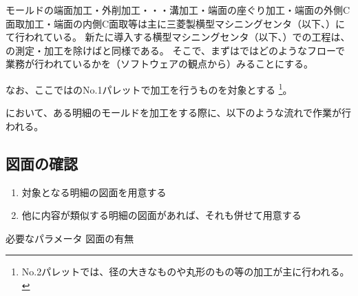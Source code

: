 

モールドの端面加工・外削加工・・・溝加工・端面の座ぐり加工・端面の外側C面取加工・端面の内側C面取等は主に三菱製横型マシニングセンタ（以下、\textbf{\MMname}）にて行われている。
新たに導入する横型マシニングセンタ（以下、\textbf{\DMname}）での工程は、\dimple の測定・加工を除けば\MMname と同様である。
そこで、まずは\MMname ではどのようなフローで業務が行われているかを（ソフトウェアの観点から）みることにする。
\begin{marker}
なお、ここでは\MMname のNo.1パレットで加工を行うものを対象とする
\footnote{No.2パレットでは、径の大きなものや丸形のもの等の加工が主に行われる。}。
\end{marker}



\MMname において、ある明細のモールドを加工をする際に、以下のような流れで作業が行われる。


\subsection{図面の確認}
\begin{enumerate}
\item 対象となる明細の図面を用意する
\item 他に内容が類似する明細の図面があれば、それも併せて用意する
\end{enumerate}
\begin{Parameter}{必要なパラメータ}
図面の有無
\end{Parameter}


